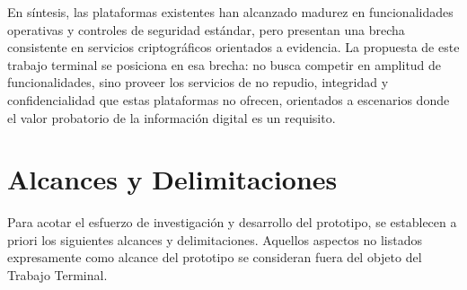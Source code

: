 En síntesis, las plataformas existentes han alcanzado madurez en funcionalidades operativas y controles de seguridad estándar, pero presentan una brecha consistente en servicios criptográficos orientados a evidencia. La propuesta de este trabajo terminal se posiciona en esa brecha: no busca competir en amplitud de funcionalidades, sino proveer los servicios de no repudio, integridad y confidencialidad que estas plataformas no ofrecen, orientados a escenarios donde el valor probatorio de la información digital es un requisito.

\section{Alcances y Delimitaciones}\label{sec:alcances}

Para acotar el esfuerzo de investigación y desarrollo del prototipo, se establecen a priori los siguientes alcances y delimitaciones. Aquellos aspectos no listados expresamente como alcance del prototipo se consideran fuera del objeto del Trabajo Terminal.

